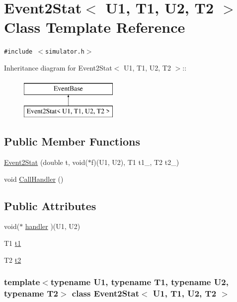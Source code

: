 \hypertarget{classEvent2Stat}{
\section{Event2Stat$<$ U1, T1, U2, T2 $>$ Class Template Reference}
\label{classEvent2Stat}
}
{\tt \#include $<$simulator.h$>$}

Inheritance diagram for Event2Stat$<$ U1, T1, U2, T2 $>$::\begin{figure}[H]
\begin{center}
\leavevmode
\includegraphics[height=2cm]{classEvent2Stat}
\end{center}
\end{figure}
\subsection*{Public Member Functions}
\begin{CompactItemize}
\item 
\hyperlink{classEvent2Stat_ad167681d8833e8300e76e60d8766b81}{Event2Stat} (double t, void($\ast$f)(U1, U2), T1 t1\_, T2 t2\_)
\item 
void \hyperlink{classEvent2Stat_84e6e9e412678507da3b2bde8e6a157a}{CallHandler} ()
\end{CompactItemize}
\subsection*{Public Attributes}
\begin{CompactItemize}
\item 
void($\ast$ \hyperlink{classEvent2Stat_c376cfc98a16f3365e21be171d8d491a}{handler} )(U1, U2)
\item 
T1 \hyperlink{classEvent2Stat_5daf0d729d5a79162abdb89b4efb19c1}{t1}
\item 
T2 \hyperlink{classEvent2Stat_ebb30c7ef2db2fb567415879c49827fb}{t2}
\end{CompactItemize}
\subsubsection*{template$<$typename U1, typename T1, typename U2, typename T2$>$ class Event2Stat$<$ U1, T1, U2, T2 $>$}



